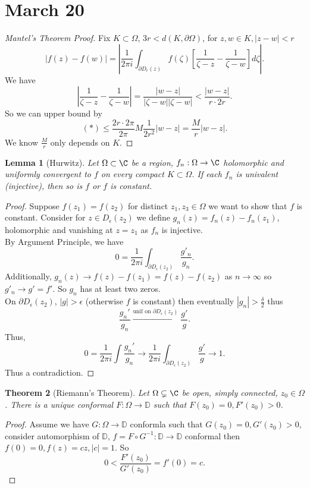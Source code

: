 \documentclass[a4paper]{article}
\newtheorem{thm}{Theorem}[section]
\newtheorem{lem}[thm]{Lemma}
\begin{document}
\section{March 20}
\begin{proof}[Mantel's Theorem Proof]
    Fix $K\subset \Omega$, $3r<d(K,\partial \Omega)$, for $z,w\in K, |z-w|<r$
    \[
    |f(z)-f(w)|= \left | \frac{1}{2\pi i} \int_{\partial D_r(z)} f(\zeta) \left [\frac{1}{\zeta-z}-\frac{1}{\zeta-w} \right ] d\zeta \right | \tag{$*$}
    .\] 
    We have 
    \[
    \left |\frac{1}{\zeta-z}-\frac{1}{\zeta-w} \right |=\frac{|w-z|}{|\zeta-w||\zeta-w|}<\frac{|w-z|}{r\cdot 2r}
    .\] 
    So we can upper bound by 
    \[
    (*)\leq \frac{2r\cdot 2\pi}{2\pi}M \frac{1}{2r^2}|w-z|=\frac{M}{r}|w-z|
    .\] 
    We know $\frac{M}{r}$ only depends on $K$.
\end{proof}
\begin{lem}[Hurwitz]
    Let $\Omega\subset \C$ be a region, $f_n:\Omega\to \C$ holomorphic and uniformly convergent to $f$ on every compact $K\subset \Omega$. If each $f_n$ is univalent (injective), then so is $f$ or $f$ is constant. 
\end{lem}
\begin{proof}
    Suppose $f(z_1)=f(z_2)$ for distinct $z_1,z_3\in \Omega$ we want to show that $f$ is constant. Consider for $z\in D_\epsilon(z_2)$ we define $g_n(z)=f_n(z)-f_n(z_1)$, holomorphic and vanishing at $z=z_1$ as $f_n$ is injective. \\
    By Argument Principle, we have 
    \[
    0= \frac{1}{2\pi i}\int_{\partial D_\epsilon(z_2)} \frac{g'_n}{g_n}
    .\] 
    Additionally, $g_n(z)\to f(z)-f(z_1)=f(z)-f(z_2)$ as $n\to \infty$ so $g'_n\to g'=f'$. So $g_n$ has at least two zeros.\\
    On $\partial D_\epsilon(z_2)$, $|g|>\epsilon$ (otherwise $f$ is constant) then eventually $|g_n|>\frac{\delta}{2}$ thus 
    \[
        \frac{g_n'}{g_n}\xrightarrow{\text{unif on } \partial D_\epsilon(z_2) } \frac{g'}{g}
    .\]  
    Thus,
    \[
    0= \frac{1}{2\pi i}\int \frac{g_n'}{g_n} \to \frac{1}{2\pi i}\int_{\partial D_\epsilon(z_2)} \frac{g'}{g}\to 1
    .\] 
    Thus a contradiction. 
\end{proof}
\begin{thm}[Riemann's Theorem]
    Let $\Omega\subsetneq \C$ be open, simply connected, $z_0\in \Omega$. There is a unique conformal $F:\Omega\to \mathbb{D}$ such that $F(z_0)=0, F'(z_0)>0$. 
\end{thm}

\begin{proof}
    Assume we have $G:\Omega\to \mathbb{D}$ conformla such that $G(z_0)=0, G'(z_0)>0$, consider automorphism of $\mathbb{D}$, $f=F\circ G^{-1}:\mathbb{D}\to\mathbb{D}$ conformal then $f(0)=0, f(z)=cz, |c|=1$. So
    \[
    0< \frac{F'(z_0)}{G'(z_0)}=f'(0)=c
    .\] 
\end{proof}
\end{document}
